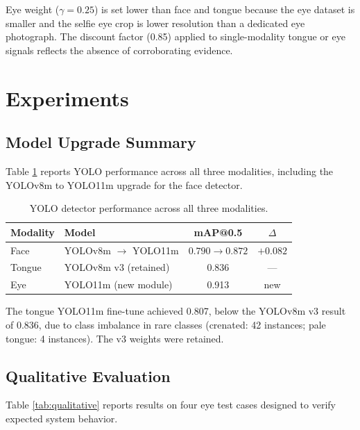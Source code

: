 \documentclass[journal]{IEEEtran}
\begin{document}
Eye weight ($\gamma=0.25$) is set lower than face and tongue because
the eye dataset is smaller and the selfie eye crop is lower resolution
than a dedicated eye photograph. The discount factor (0.85) applied to
single-modality tongue or eye signals reflects the absence of
corroborating evidence.

\section{Experiments}
\label{sec:experiments}

\subsection{Model Upgrade Summary}

Table \ref{tab:yolo_comparison} reports YOLO performance across all
three modalities, including the YOLOv8m to YOLO11m upgrade for the
face detector.

\begin{table}[h]
\centering
\caption{YOLO detector performance across all three modalities.}
\label{tab:yolo_comparison}
\begin{tabular}{llcc}
\toprule
\textbf{Modality} & \textbf{Model} & \textbf{mAP@0.5} & $\Delta$ \\
\midrule
Face  & YOLOv8m $\to$ YOLO11m & $0.790 \to 0.872$ & $+0.082$ \\
Tongue & YOLOv8m v3 (retained)  & 0.836              & — \\
Eye   & YOLO11m (new module)   & 0.913              & new \\
\bottomrule
\end{tabular}
\end{table}

The tongue YOLO11m fine-tune achieved 0.807, below the YOLOv8m v3
result of 0.836, due to class imbalance in rare classes (crenated:
42 instances; pale tongue: 4 instances). The v3 weights were retained.

\subsection{Qualitative Evaluation}

Table \ref{tab:qualitative} reports results on four eye test cases
designed to verify expected system behavior.
\end{document}

